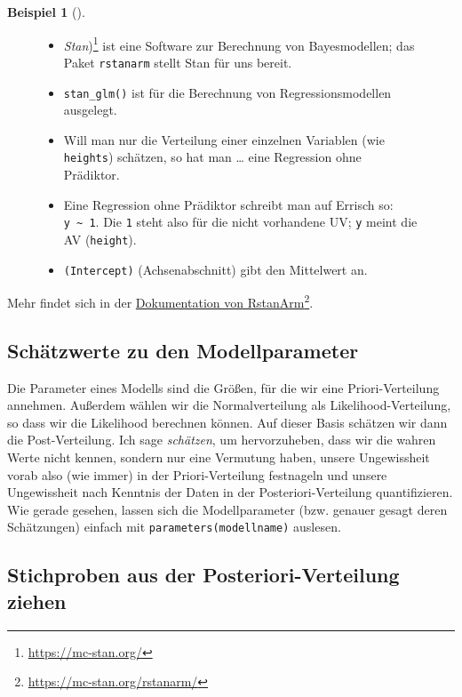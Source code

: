 \documentclass[
  ngerman,
  letterpaper,
  twoside,
  open=any]{scrbook}
\providecommand{\tightlist}{%
  \setlength{\itemsep}{0pt}\setlength{\parskip}{0pt}}\usepackage{longtable,booktabs,array}
\theoremstyle{definition}
\newtheorem{example}{Beispiel}[chapter]
\theoremstyle{plain}
\theoremstyle{definition}
\theoremstyle{definition}
\theoremstyle{remark}
\begin{document}
\begin{example}[]
\begin{figure}
\begin{minipage}[t]{0.80\linewidth}
\begin{itemize}
\tightlist
\item
  \emph{Stan})\footnote{\url{https://mc-stan.org/}} ist eine Software
  zur Berechnung von Bayesmodellen; das Paket \texttt{rstanarm} stellt
  Stan für uns bereit.
\item
  \texttt{stan\_glm()} ist für die Berechnung von Regressionsmodellen
  ausgelegt.
\item
  Will man nur die Verteilung einer einzelnen Variablen (wie
  \texttt{heights}) schätzen, so hat man \ldots{} eine Regression ohne
  Prädiktor.
\item
  Eine Regression ohne Prädiktor schreibt man auf Errisch so:
  \texttt{y\ \textasciitilde{}\ 1}. Die \texttt{1} steht also für die
  nicht vorhandene UV; \texttt{y} meint die AV (\texttt{height}).
\item
  \texttt{(Intercept)} (Achsenabschnitt) gibt den Mittelwert an.
\end{itemize}

\end{minipage}%

\end{figure}%

Mehr findet sich in der
\href{https://mc-stan.org/rstanarm/}{Dokumentation von
RstanArm}\footnote{\url{https://mc-stan.org/rstanarm/}}.

\subsection{Schätzwerte zu den
Modellparameter}\label{schuxe4tzwerte-zu-den-modellparameter}

Die Parameter eines Modells sind die Größen, für die wir eine
Priori-Verteilung annehmen. Außerdem wählen wir die Normalverteilung als
Likelihood-Verteilung, so dass wir die Likelihood berechnen können. Auf
dieser Basis schätzen wir dann die Post-Verteilung. Ich sage
\emph{schätzen}, um hervorzuheben, dass wir die wahren Werte nicht
kennen, sondern nur eine Vermutung haben, unsere Ungewissheit vorab also
(wie immer) in der Priori-Verteilung festnageln und unsere Ungewissheit
nach Kenntnis der Daten in der Posteriori-Verteilung quantifizieren. Wie
gerade gesehen, lassen sich die Modellparameter (bzw. genauer gesagt
deren Schätzungen) einfach mit \texttt{parameters(modellname)} auslesen.

\subsection{Stichproben aus der Posteriori-Verteilung
ziehen}\label{stichproben-aus-der-posteriori-verteilung-ziehen}


\end{example}
\end{document}
